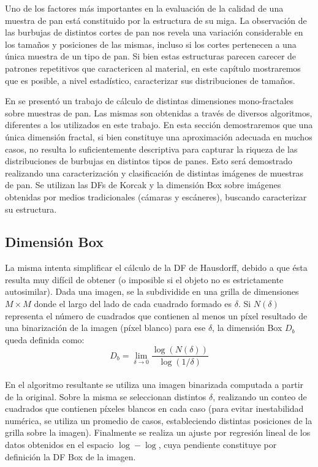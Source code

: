 Uno de los factores más importantes en la evaluación de la calidad de una muestra de pan está constituido por la estructura de su miga.
La observación de las burbujas de distintos cortes de pan nos revela una variación considerable en los tamaños y posiciones de las mismas, incluso si los cortes pertenecen a una única muestra de un tipo de pan.
Si bien estas estructuras parecen carecer de patrones repetitivos que caractericen al material, en este capítulo mostraremos que es posible, a nivel estadístico, caracterizar sus distribuciones de tamaños.

En \cite{Gonzales2008} se present\'o un trabajo de c\'alculo de distintas dimensiones mono-fractales sobre muestras de pan.
Las mismas son obtenidas a trav\'es de diversos algoritmos, diferentes a los utilizados en este trabajo.
En esta sección demostraremos que una única dimensión fractal, si bien constituye una aproximación adecuada en muchos casos, no resulta lo suficientemente descriptiva para capturar la riqueza de las distribuciones de burbujas en distintos tipos de panes.
Esto será demostrado realizando una caracterización y clasificación de distintas imágenes de muestras de pan.
Se utilizan las DFs de Korcak \cite{Mandelbrot1983} y la dimensi\'on Box \cite{Peitgen2004} sobre imágenes obtenidas por medios tradicionales (cámaras y escáneres), buscando caracterizar su estructura.


\subsection{Dimensi\'on Box}
La misma intenta simplificar el c\'alculo de la DF de Hausdorff, debido a que \'esta resulta muy dif\'icil de obtener \cite{Peitgen2004} (o imposible si el objeto no es estrictamente autosimilar).
Dada una imagen, se la subdividide en una grilla de dimensiones $M\times M$ donde el largo del lado de cada cuadrado formado es $\delta$. Si $N(\delta)$ representa el n\'umero de cuadrados que contienen al menos un p\'ixel resultado de una binarizaci\'on de la imagen (p\'ixel blanco) para ese $\delta$, la dimensi\'on Box $D_{b}$ queda definida como:\\

$$D_{b} = \displaystyle\lim_{\delta \to 0}{\frac{\log(N(\delta))}{\log (1/\delta)}}$$\\

En el algoritmo resultante se utiliza una imagen binarizada computada a partir de la original. Sobre la misma se seleccionan distintos $\delta$, realizando un conteo de cuadrados que contienen p\'ixeles blancos en cada caso (para evitar inestabilidad num\'erica, se utiliza un promedio de casos, estableciendo distintas posiciones de la grilla sobre la imagen). Finalmente se realiza un ajuste por regresi\'on lineal de los datos obtenidos en el espacio $\log-\log$, cuya pendiente constituye por definici\'on la DF Box de la imagen.

